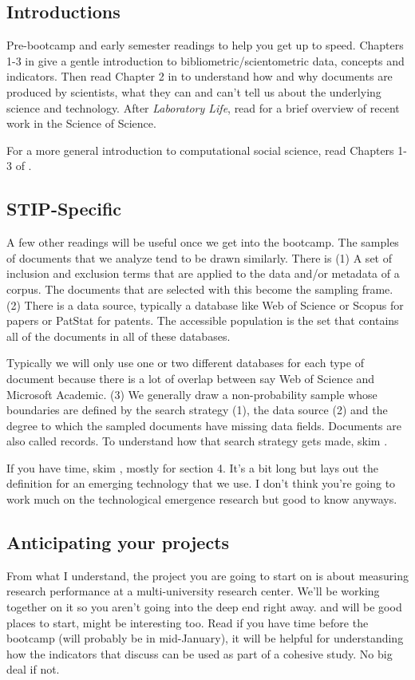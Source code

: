 \documentclass[12pt,letterpaper]{article} %
\begin{document}
\subsection{Introductions}
Pre-bootcamp and early semester readings to help you get up to speed.  Chapters 1-3 in \cite{sugimoto2018measuring} give a gentle introduction to bibliometric/scientometric data, concepts and indicators.  Then read Chapter 2 in \cite{latour_laboratory_1979} to understand how and why documents are produced by scientists, what they can and can't tell us about the underlying science and technology.  After \textit{Laboratory Life}, read \cite{fortunato_science_2018} for a brief overview of recent work in the Science of Science.

For a more general introduction to computational social science, read Chapters 1-3 of \citep{salganik2019bit}.

\subsection{STIP-Specific}
A few other readings will be useful once we get into the bootcamp.  The samples of documents that we analyze tend to be drawn similarly.  There is (1) A set of inclusion and exclusion terms that are applied to the data and/or metadata of a corpus.  The documents that are selected with this become the sampling frame. (2) There is a data source, typically a database like Web of Science or Scopus for papers or PatStat for patents.  The accessible population is the set that contains all of the documents in all of these databases.  

Typically we will only use one or two different databases for each type of document because there is a lot of overlap between say Web of Science and Microsoft Academic.  (3) We generally draw a non-probability sample whose boundaries are defined by the search strategy (1), the data source (2) and the degree to which the sampled documents have missing data fields.  Documents are also called records.  To understand how that search strategy gets made, skim \cite{porter2008refining}.

If you have time, skim \cite{rotolo_what_2015}, mostly for section 4.  It's a bit long but lays out the definition for an emerging technology that we use.  I don't think you're going to work much on the technological emergence research but good to know anyways.  

\subsection{Anticipating your projects}
From what I understand, the project you are going to start on is about measuring research performance at a multi-university research center.  We'll be working together on it so you aren't going into the deep end right away.  \cite{leahey_prominent_2017} and \citep{dahlander_ties_2013} will be good places to start, \cite{biancani_superstars_2018} might be interesting too.  Read \cite{leahey_prominent_2017} if you have time before the bootcamp (will probably be in mid-January), it will be helpful for understanding how the indicators that \cite{sugimoto2018measuring} discuss can be used as part of a cohesive study.  No big deal if not.
\end{document}
